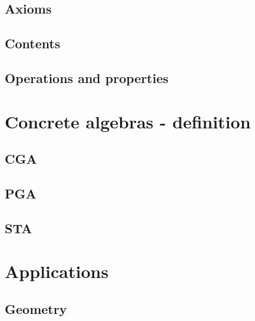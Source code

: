 \subsection{Axioms}

\subsection{Contents}



\subsection{Operations and properties}

\section{Concrete algebras - definition}

\subsection{CGA}

\subsection{PGA}

\subsection{STA}

\section{Applications}

\subsection{Geometry}


% 

\ifplastex
\else

\fi

